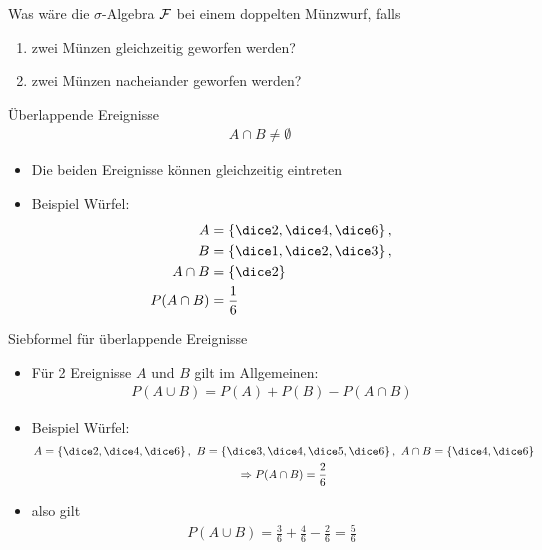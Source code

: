\begin{Aufgabe}
  Was wäre die $\sigma$-Algebra $\mathcal F $ bei einem doppelten Münzwurf, falls
  \begin{enumerate}
  \item zwei Münzen gleichzeitig geworfen werden?
  \item zwei Münzen nacheiander geworfen werden?
  \end{enumerate}
\end{Aufgabe}

\begin{frame}{Überlappende Ereignisse}
  \begin{gather*}
    A\cap B \neq \emptyset
  \end{gather*}
  \begin{itemize}
  \item Die beiden Ereignisse können gleichzeitig eintreten
  \item  Beispiel Würfel:
    \begin{align*}
      A&=\left\{\dice2,\dice4,\dice6\right\},
      \\B&=\left\{\dice1,\dice2,\dice3\right\},
      \\A\cap B&= \left\{\dice2\right\} \\
      P(A\cap B) &= \frac{1}{6}
    \end{align*}
  \end{itemize}
\end{frame}

\begin{frame}{Siebformel für überlappende Ereignisse}
    \begin{itemize}
        \item Für 2 Ereignisse $A$ und $B$ gilt im Allgemeinen:
        \begin{gather*}
            P(A\cup B) = P(A) +P(B)-P(A\cap B)    
        \end{gather*}
        \item  Beispiel Würfel:
        \begin{gather*}
          A=\left\{\dice2,\dice4,\dice6\right\},
          \ B=\left\{\dice3,\dice4,\dice5,\dice6\right\},
          \ A\cap B= \left\{\dice4,\dice6\right\} \\
            \Rightarrow P(A\cap B) = \frac{2}{6}
        \end{gather*}
        \item also gilt 
        \begin{gather*}
            P(A\cup B)= \frac{3}{6} + \frac{4}{6} - \frac{2}{6} = \frac{5}{6}
        \end{gather*}
    \end{itemize}
\end{frame}

